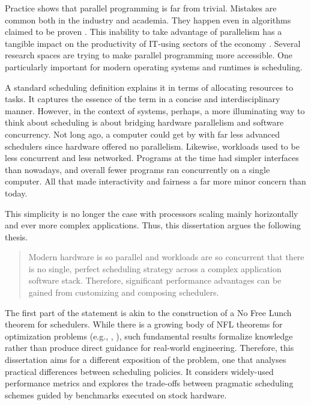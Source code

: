\documentclass[12pt,a4paper,twoside]{report}
\begin{document}
Practice shows that parallel programming is far from trivial. Mistakes are common both in the industry and academia. They happen even in algorithms claimed to be proven \cite{Norris2013}. This inability to take advantage of parallelism has a tangible impact on the productivity of IT-using sectors of the economy \cite{Khan2018}. Several research spaces are trying to make parallel programming more accessible. One particularly important for modern operating systems and runtimes is scheduling. 

A standard scheduling definition explains it in terms of allocating resources to tasks. It captures the essence of the term in a concise and interdisciplinary manner. However, in the context of systems, perhaps, a more illuminating way to think about scheduling is about bridging hardware parallelism and software concurrency. Not long ago, a computer could get by with far less advanced schedulers since hardware offered no parallelism. Likewise, workloads used to be less concurrent and less networked. Programs at the time had simpler interfaces than nowadays, and overall fewer programs ran concurrently on a single computer. All that made interactivity and fairness a far more minor concern than today. 

This simplicity is no longer the case with processors scaling mainly horizontally and ever more complex applications. Thus, this dissertation argues the following thesis. 

\begin{quote}
    Modern hardware is so parallel and workloads are so concurrent that there is no single, perfect scheduling strategy across a complex application software stack. Therefore, significant performance advantages can be gained from customizing and composing schedulers.
\end{quote} 

The first part of the statement is akin to the construction of a No Free Lunch theorem \cite{Ho2002} for schedulers. While there is a growing body of NFL theorems for optimization problems (e.g., \cite{Wolpert1997}, \cite{Igel2005}), such fundamental results formalize knowledge rather than produce direct guidance for real-world engineering. Therefore, this dissertation aims for a different exposition of the problem, one that analyses practical differences between scheduling policies. It considers widely-used performance metrics and explores the trade-offs between pragmatic scheduling schemes guided by benchmarks executed on stock hardware. 
\end{document}
